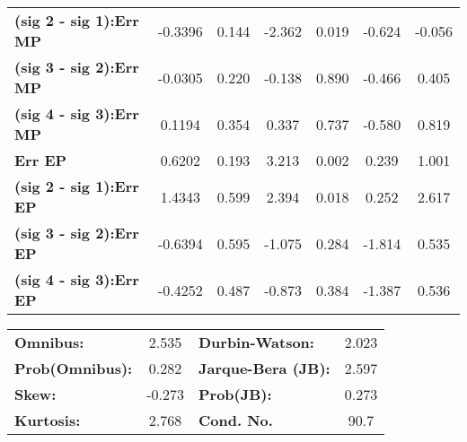 \begin{center}
\begin{tabular}{lcccccc}
\textbf{(sig 2 - sig 1):Err MP} &      -0.3396  &        0.144     &    -2.362  &         0.019        &       -0.624    &       -0.056     \\
\textbf{(sig 3 - sig 2):Err MP} &      -0.0305  &        0.220     &    -0.138  &         0.890        &       -0.466    &        0.405     \\
\textbf{(sig 4 - sig 3):Err MP} &       0.1194  &        0.354     &     0.337  &         0.737        &       -0.580    &        0.819     \\
\textbf{Err EP}                 &       0.6202  &        0.193     &     3.213  &         0.002        &        0.239    &        1.001     \\
\textbf{(sig 2 - sig 1):Err EP} &       1.4343  &        0.599     &     2.394  &         0.018        &        0.252    &        2.617     \\
\textbf{(sig 3 - sig 2):Err EP} &      -0.6394  &        0.595     &    -1.075  &         0.284        &       -1.814    &        0.535     \\
\textbf{(sig 4 - sig 3):Err EP} &      -0.4252  &        0.487     &    -0.873  &         0.384        &       -1.387    &        0.536     \\
\bottomrule
\end{tabular}
\end{center}\begin{center}
\begin{tabular}{lclc}
\toprule
\textbf{Omnibus:}       &  2.535 & \textbf{  Durbin-Watson:     } &    2.023  \\
\textbf{Prob(Omnibus):} &  0.282 & \textbf{  Jarque-Bera (JB):  } &    2.597  \\
\textbf{Skew:}          & -0.273 & \textbf{  Prob(JB):          } &    0.273  \\
\textbf{Kurtosis:}      &  2.768 & \textbf{  Cond. No.          } &     90.7  \\
\bottomrule
\end{tabular}
\end{center}



